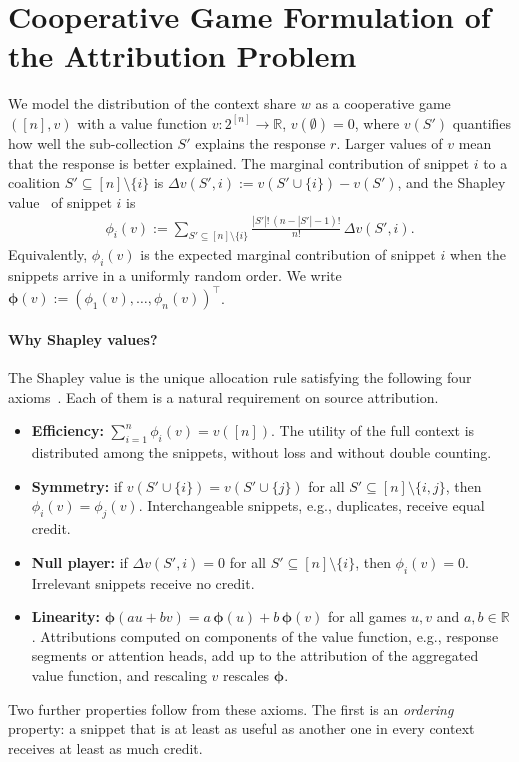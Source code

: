 \section{Cooperative Game Formulation of the Attribution Problem}
\label{sec:coop_game}

We model the distribution of the context share $w$ as a cooperative game $([n], v)$ with a value function $v: 2^{[n]} \to \mathbb{R}$, $v(\emptyset) = 0$, where $v(S')$ quantifies how well the sub-collection $S'$ explains the response $r$. Larger values of $v$ mean that the response is better explained. The marginal contribution of snippet $i$ to a coalition $S' \subseteq [n] \setminus \{i\}$ is $\Delta v(S', i) := v(S' \cup \{i\}) - v(S')$, and the Shapley value~\cite{shapley1953value} of snippet $i$ is
\begin{align}\label{eq:shapley_def}
    \phi_i(v) := \sum_{S' \subseteq [n] \setminus \{i\}} \frac{|S'|!\,(n - |S'| - 1)!}{n!} \, \Delta v(S', i).
\end{align}
Equivalently, $\phi_i(v)$ is the expected marginal contribution of snippet $i$ when the snippets arrive in a uniformly random order. We write $\boldsymbol{\phi}(v) := (\phi_1(v), \dots, \phi_n(v))^\top$.

\paragraph{Why Shapley values?}
The Shapley value is the unique allocation rule satisfying the following four axioms~\cite{shapley1953value}. Each of them is a natural requirement on source attribution.
\begin{itemize}
    \item \textbf{Efficiency:} $\sum_{i=1}^n \phi_i(v) = v([n])$. The utility of the full context is distributed among the snippets, without loss and without double counting.
    \item \textbf{Symmetry:} if $v(S' \cup \{i\}) = v(S' \cup \{j\})$ for all $S' \subseteq [n] \setminus \{i,j\}$, then $\phi_i(v) = \phi_j(v)$. Interchangeable snippets, e.g., duplicates, receive equal credit.
    \item \textbf{Null player:} if $\Delta v(S', i) = 0$ for all $S' \subseteq [n] \setminus \{i\}$, then $\phi_i(v) = 0$. Irrelevant snippets receive no credit.
    \item \textbf{Linearity:} $\boldsymbol{\phi}(a u + b v) = a\, \boldsymbol{\phi}(u) + b\, \boldsymbol{\phi}(v)$ for all games $u, v$ and $a, b \in \mathbb{R}$. Attributions computed on components of the value function, e.g., response segments or attention heads, add up to the attribution of the aggregated value function, and rescaling $v$ rescales $\boldsymbol{\phi}$.
\end{itemize}
Two further properties follow from these axioms. The first is an \emph{ordering} property: a snippet that is at least as useful as another one in every context receives at least as much credit.

